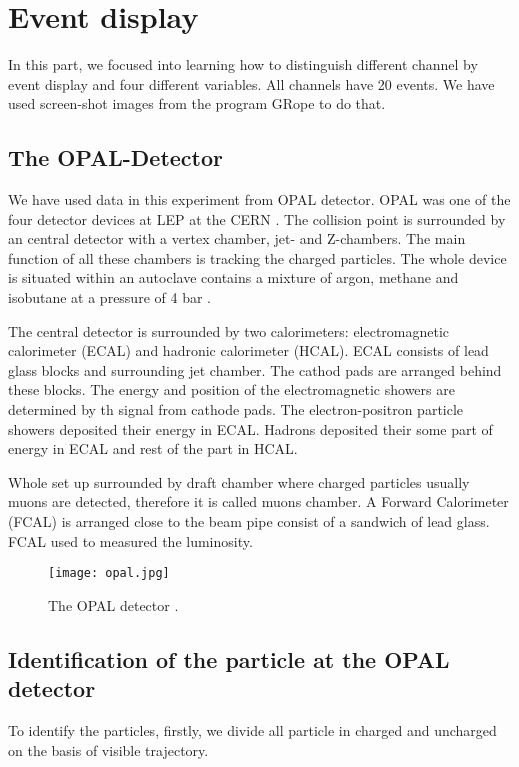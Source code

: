 
\section{Event display}
In this part, we focused into learning how to distinguish different channel by event display and four different variables. All channels have 20 events. We have used screen-shot images from the program GRope to do that.

\subsection{The OPAL-Detector}
We have used data in this experiment from OPAL detector. OPAL was one of the four detector devices at LEP at the CERN \cite{manual}. The collision point is surrounded by an central detector with  a vertex chamber, jet- and Z-chambers. The main function of all these chambers is tracking the charged particles. The whole device is situated within an autoclave contains a mixture of argon, methane and isobutane at a pressure of 4 bar \cite{manual}.

The central detector is surrounded by two calorimeters: electromagnetic calorimeter (ECAL) and hadronic calorimeter (HCAL). ECAL consists of lead glass blocks and surrounding jet chamber. The cathod pads are arranged behind these blocks. The energy and position of the electromagnetic showers are determined by th signal from cathode pads. The electron-positron particle showers deposited their energy in ECAL. Hadrons deposited their some part of energy in ECAL and rest of the part in HCAL. 

Whole set up surrounded by draft chamber where charged particles usually muons are detected, therefore it is called muons chamber. A Forward Calorimeter (FCAL) is arranged close to the beam pipe consist of a sandwich of lead glass. FCAL used to measured the luminosity.


 \begin{figure}[H]
 	\centering
 	\texttt{[image: opal.jpg]}
 	\caption{ The OPAL detector \cite{manual}. }
 	\label{fig:OPAL}
 \end{figure}

\subsection{Identification of the particle at the OPAL detector}
To identify the particles, firstly, we divide all particle in charged and uncharged on the basis of visible trajectory.

